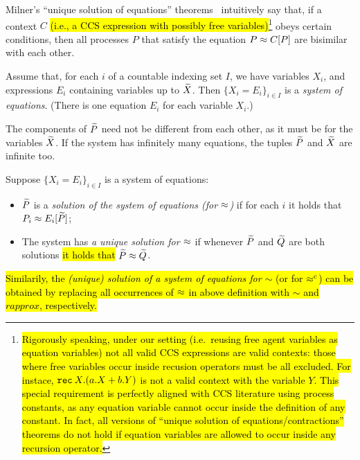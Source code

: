 Milner's ``unique solution of equations'' theorems~\cite{Mil89} intuitively
say that, if a context $C$ \hl{(i.e., a CCS expression with possibly
free variables)}\footnote{\hl{Rigorously speaking, under our setting
(i.e.~reusing free agent variables as equation variables) not all
valid CCS expressions
are valid contexts: those where free variables occur inside
recusion operators must be all excluded. For instace, ${\tt rec}\: X . (a.X +
b.Y)$ is not a valid context with the variable $Y$. This special requirement
is perfectly aligned with CCS literature using process constants, as any
equation variable cannot occur inside the definition of any
constant. In fact, all versions of ``unique solution of
equations/contractions'' theorems do not hold if equation variables
are allowed to occur inside any recursion operator.}} obeys certain conditions,
then all processes $P$ that satisfy the equation $P \approx C [P]$ are
bisimilar with each other.

\begin{definition}[equations] %
Assume that, for each $i$ of 
 a countable indexing set $I$, we have variables $X_i$, and expressions
$E_i$ containing variables up to $\widetilde X$. Then 
$\{ X_i = E_i\}_{i\in I}$ is 
  a \emph{system of equations}. (There is one equation $E_i$ for each variable $X_i$.)
\end{definition}

The components of $\widetilde P$ need not be
different from each other, as it must be for the variables $\widetilde X$.
If the system has infinitely many equations, the  tuples $\widetilde P$ and $\widetilde X$ are infinite too.

\begin{definition}
Suppose $\{ X_i = E_i\}_{i\in I}$ is a system of equations: 
\begin{itemize}
\item
 $\widetilde P$ is a \emph{solution of the system of equations (for $\approx$)} 
if for each $i$ it holds that $P_i \approx E_i [\widetilde P]$;
\item The system has \emph{a unique solution for $\approx$}  if whenever 
 $\widetilde P$ and $\widetilde Q$ are both solutions \hl{it holds that} $\widetilde P \approx \widetilde Q$. 
\end{itemize} 
 \end{definition}
\hl{Similarily, the \emph{(unique) solution of a system of equations for $\sim$}
(or for $\mathrel{\approx^{\rm{c}}}$) can be obtained by replacing all occurrences of $\approx$
in above definition with $\sim$ and $rapprox$, respectively.}

